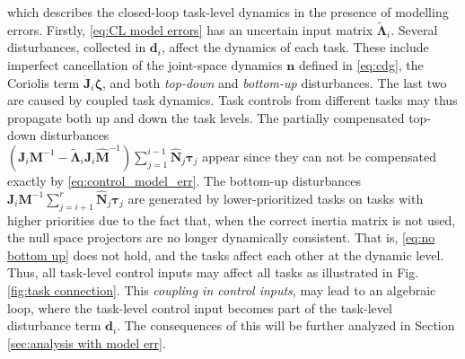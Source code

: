 \documentclass[../main.tex]{subfiles}
\begin{document}
which describes the closed-loop task-level dynamics in the presence of modelling errors. Firstly, \eqref{eq:CL model errors} has an uncertain input matrix $\tilde{\bm{\Lambda}}_i$. Several disturbances, collected in $\bm{d}_i$, affect the dynamics of each task. These include imperfect cancellation of the joint-space dynamics $\bm{n}$ defined in \eqref{eq:cdg}, the Coriolis term $\dot{\bm{J}}_i\bm{\zeta}$, and both \emph{top-down} and \emph{bottom-up} disturbances. The last two are caused by coupled task dynamics. Task controls from different tasks may thus propagate both up and down the task levels. The partially compensated top-down disturbances \\ $\left(\bm{J}_i\bm{M}^{-1} - \tilde{\bm{\Lambda}}_i \bm{J}_i\hat{\bm{M}}^{-1}\right)\sum_{j=1}^{i-1}\hat{\bm{N}}_j\bm{\tau}_j$ appear since they can not be compensated exactly by \eqref{eq:control_model_err}. The bottom-up disturbances $ \bm{J}_i\bm{M}^{-1} \sum_{j=i+1}^{r} \hat{\bm{N}}_{j}\bm{\tau}_j$ are generated by lower-prioritized tasks on tasks with higher priorities due to the fact that, when the correct inertia matrix is not used, the null space projectors are no longer dynamically consistent. That is, \eqref{eq:no bottom up} does not hold, and the tasks affect each other at the dynamic level. Thus, all task-level control inputs may affect all tasks as illustrated in Fig. \ref{fig:task connection}. This \emph{coupling in control inputs}, may lead to an algebraic loop, where the task-level control input becomes part of the task-level disturbance term $\bm{d}_i$. The consequences of this will be further analyzed in Section \ref{sec:analysis with model err}.
\end{document}
